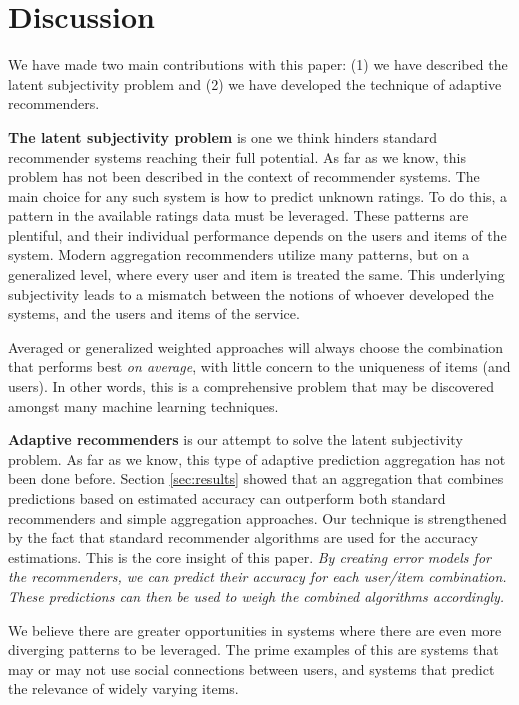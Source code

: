 \section{Discussion}
\label{sec:discussion}

We have made two main contributions with this paper:
(1) we have described the latent subjectivity problem and
(2) we have developed the technique of adaptive recommenders.

\textbf{The latent subjectivity problem} is one we think hinders
standard recommender systems reaching their full potential.
As far as we know, this problem has not been described
in the context of recommender systems.
The main choice for any such system is how to predict unknown ratings.
To do this, a pattern in the available ratings data must be leveraged.
These patterns are plentiful, and their individual performance
depends on the users and items of the system.
Modern aggregation recommenders utilize many patterns, but on a generalized
level, where every user and item is treated the same.
This underlying subjectivity leads to a mismatch between the notions
of whoever developed the systems, and the users and items of the service.

Averaged or generalized weighted approaches will always
choose the combination that performs best \emph{on average},
with little concern to the uniqueness of items (and users).
In other words, this is a comprehensive problem
that may be discovered amongst many machine learning techniques.

\textbf{Adaptive recommenders} is our attempt to solve the latent subjectivity problem.
As far as we know, this type of adaptive prediction aggregation has not been done before.
Section \ref{sec:results} showed that an aggregation that combines predictions based
on estimated accuracy can outperform both standard recommenders and simple aggregation approaches.
Our technique is strengthened by the fact that standard recommender algorithms
are used for the accuracy estimations.
This is the core insight of this paper.
\emph{By creating error models for the recommenders, we can predict
their accuracy for each user/item combination.
These predictions can then be used to weigh the combined algorithms accordingly.}

We believe there are greater opportunities in systems where there  are even more diverging
patterns to be leveraged. The prime examples of this are systems that may or may 
not use social connections between users, and systems that predict the 
relevance of widely varying items.

